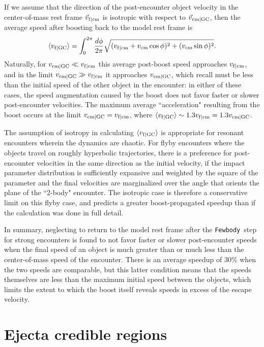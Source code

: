 \documentclass[twocolumn]{aastex631}
\newcommand{\fewbody}{\texttt{Fewbody}}
\begin{document}
If we assume that the direction of the post-encounter object velocity in the center-of-mass rest frame $\vec{v}_{\rm f|cm}$ is isotropic with respect to $\vec{v}_{\rm cm|GC}$, then the average speed after boosting back to the model rest frame is
\begin{equation}
    \langle v_{\rm f|GC} \rangle
    = \int_0^{2\pi} \frac{d\phi}{2\pi} \sqrt{(v_{\rm f|cm} + v_{\rm cm} \cos \phi)^2 + (v_{\rm cm} \sin \phi)^2}.
\end{equation}
Naturally, for $v_{\rm cm|GC} \ll v_{\rm f|cm}$ this average post-boost speed approaches $v_{\rm f|cm}$, and in the limit $v_{\rm cm|GC} \gg v_{\rm f|cm}$ it approaches $v_{\rm cm|GC}$, which recall must be less than the initial speed of the other object in the encounter: in either of these cases, the speed augmentation caused by the boost does not favor faster or slower post-encounter velocities.
The maximum average ``acceleration" resulting from the boost occurs at the limit $v_{\rm cm|GC} = v_{\rm f|cm}$, where $\langle v_{\rm f|GC} \rangle \sim 1.3 v_{\rm f|cm} = 1.3 v_{\rm cm|GC}$.

The assumption of isotropy in calculating $\langle v_{\rm f|GC} \rangle$ is appropriate for resonant encounters wherein the dynamics are chaotic.
For flyby encounters where the objects travel on roughly hyperbolic trajectories, there is a preference for post-encounter velocities in the same direction as the initial velocity, if the impact parameter distribution is sufficiently expansive and weighted by the square of the parameter and the final velocities are marginalized over the angle that orients the plane of the ``2-body" encounter.
The isotropic case is therefore a conservative limit on this flyby case, and predicts a greater boost-propagated speedup than if the calculation was done in full detail.

In summary, neglecting to return to the model rest frame after the \fewbody\ step for strong encounters is found to not favor faster or slower post-encounter speeds when the final speed of an object is much greater than or much less than the center-of-mass speed of the encounter.
There is an average speedup of 30\% when the two speeds are comparable, but this latter condition means that the speeds themselves are less than the maximum initial speed between the objects, which limits the extent to which the boost itself reveals speeds in excess of the escape velocity.

\section{Ejecta credible regions} \label{app:credreg}
\end{document}
